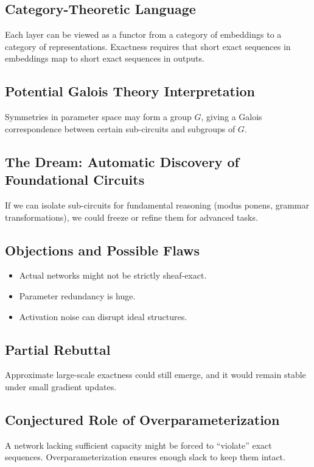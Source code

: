 \documentclass{article}
\begin{document}
\subsection{Category-Theoretic Language}
Each layer can be viewed as a functor from a category of embeddings to a category of representations. Exactness requires that short exact sequences in embeddings map to short exact sequences in outputs.

\subsection{Potential Galois Theory Interpretation}
Symmetries in parameter space may form a group $G$, giving a Galois correspondence between certain sub-circuits and subgroups of $G$.

\subsection{The Dream: Automatic Discovery of Foundational Circuits}
If we can isolate sub-circuits for fundamental reasoning (modus ponens, grammar transformations), we could freeze or refine them for advanced tasks.

\subsection{Objections and Possible Flaws}
\begin{itemize}
\item Actual networks might not be strictly sheaf-exact.
\item Parameter redundancy is huge.
\item Activation noise can disrupt ideal structures.
\end{itemize}

\subsection{Partial Rebuttal}
Approximate large-scale exactness could still emerge, and it would remain stable under small gradient updates.

\subsection{Conjectured Role of Overparameterization}
A network lacking sufficient capacity might be forced to “violate” exact sequences. Overparameterization ensures enough slack to keep them intact.
\end{document}
